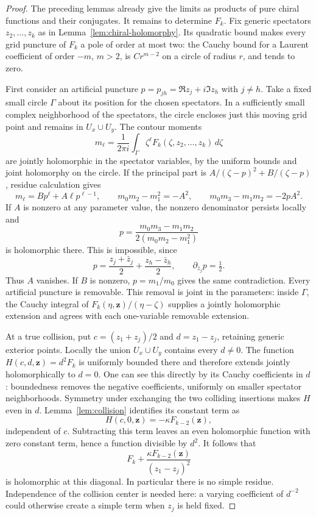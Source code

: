 \begin{proof}
The preceding lemmas already give the limits as products of pure chiral
functions and their conjugates. It remains to determine $F_k$.
Fix generic spectators $z_2,\ldots,z_k$ as in
Lemma~\ref{lem:chiral-holomorphy}. Its quadratic bound makes every
grid puncture of $F_k$ a pole of order at most two: the Cauchy bound
for a Laurent coefficient of order $-m$, $m>2$, is $Cr^{m-2}$ on a
circle of radius $r$, and tends to zero.

First consider an artificial puncture
$p=p_{jh}=\Re z_j+i\Im z_h$ with $j\ne h$.
Take a fixed small circle $\Gamma$ about its position for the chosen
spectators. In a sufficiently small complex neighborhood of the
spectators, the circle encloses just this moving grid point and remains
in $U_x\cup U_y$. The contour moments
\[
 m_\ell=\frac1{2\pi i}\int_\Gamma
                  \zeta^\ell F_k(\zeta,z_2,\ldots,z_k)\,d\zeta
\]
are jointly holomorphic in the spectator variables, by the uniform
bounds and joint holomorphy on the circle. If the principal part is
$A/(\zeta-p)^2+B/(\zeta-p)$, residue calculation gives
\begin{equation}\label{eq:chiral-pole-moments}
 m_\ell=Bp^\ell+A\ell p^{\ell-1},\qquad
 m_0m_2-m_1^2=-A^2,\qquad
 m_0m_3-m_1m_2=-2pA^2.
\end{equation}
If $A$ is nonzero at any parameter value, the nonzero denominator
persists locally and
\[
             p=\frac{m_0m_3-m_1m_2}
                       {2(m_0m_2-m_1^2)}
\]
is holomorphic there. This is impossible, since
\[
 p=\frac{z_j+\bar z_j}{2}+\frac{z_h-\bar z_h}{2},
                         \qquad \partial_{\bar z_j}p=\tfrac12.
\]
Thus $A$ vanishes. If $B$ is nonzero, $p=m_1/m_0$ gives the same
contradiction. Every artificial puncture is removable.
This removal is joint in the parameters: inside $\Gamma$, the Cauchy
integral of $F_k(\eta,\mathbf z)/(\eta-\zeta)$ supplies a jointly
holomorphic extension and agrees with each one-variable removable
extension.

At a true collision, put
$c=(z_1+z_j)/2$ and $d=z_1-z_j$, retaining generic exterior points.
Locally the union $U_x\cup U_y$ contains every $d\ne0$.
The function
$H(c,d,\mathbf z)=d^2F_k$ is uniformly bounded there and therefore
extends jointly holomorphically to $d=0$. One can see this directly
by its Cauchy coefficients in $d$: boundedness removes the negative
coefficients, uniformly on smaller spectator neighborhoods.
Symmetry under exchanging the two colliding insertions makes $H$ even
in $d$. Lemma~\ref{lem:collision} identifies its constant term as
\[
 H(c,0,\mathbf z)
             =-\kappa F_{k-2}(\mathbf z),
\]
independent of $c$. Subtracting this term leaves an even holomorphic
function with zero constant term, hence a function divisible by $d^2$.
It follows that
\[
 F_k+\frac{\kappa F_{k-2}(\mathbf z)}{(z_1-z_j)^2}
\]
is holomorphic at this diagonal. In particular there is no simple
residue. Independence of the collision center is needed here: a varying
coefficient of $d^{-2}$ could otherwise create a simple term when
$z_j$ is held fixed.


\end{proof}
